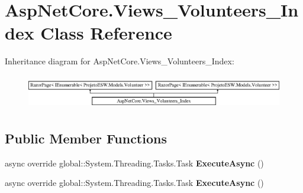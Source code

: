 \hypertarget{class_asp_net_core_1_1_views___volunteers___index}{}\section{Asp\+Net\+Core.\+Views\+\_\+\+Volunteers\+\_\+\+Index Class Reference}
\label{class_asp_net_core_1_1_views___volunteers___index}
Inheritance diagram for Asp\+Net\+Core.\+Views\+\_\+\+Volunteers\+\_\+\+Index\+:\begin{figure}[H]
\begin{center}
\leavevmode
\includegraphics[height=1.530055cm]{class_asp_net_core_1_1_views___volunteers___index}
\end{center}
\end{figure}
\subsection*{Public Member Functions}
\begin{DoxyCompactItemize}
\item 
\mbox{\label{class_asp_net_core_1_1_views___volunteers___index_a04996c45eabf2991184bc33f7ce4cf88}} 
async override global\+::\+System.\+Threading.\+Tasks.\+Task {\bfseries Execute\+Async} ()
\item 
\mbox{\label{class_asp_net_core_1_1_views___volunteers___index_a04996c45eabf2991184bc33f7ce4cf88}} 
async override global\+::\+System.\+Threading.\+Tasks.\+Task {\bfseries Execute\+Async} ()
\end{DoxyCompactItemize}
